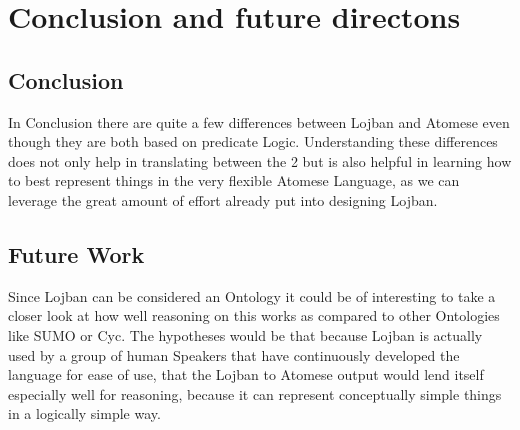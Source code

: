 
\chapter{Conclusion and future directons} %

\label{Chapter1} %


\newcommand{\keyword}[1]{\textbf{#1}}
\newcommand{\tabhead}[1]{\textbf{#1}}
\newcommand{\code}[1]{\texttt{#1}}
\newcommand{\file}[1]{\texttt{\bfseries#1}}
\newcommand{\option}[1]{\texttt{\itshape#1}}


\section{Conclusion}

In Conclusion there are quite a few differences between Lojban and Atomese even though they are both based on predicate Logic. Understanding these differences does not only help in translating between the 2 but is also helpful in learning how to best represent things in the very flexible Atomese Language, as we can leverage the great amount of effort already put into designing Lojban.

\section{Future Work}

Since Lojban can be considered an Ontology it could be of interesting to take a closer look at how well reasoning on this works as compared to other Ontologies like SUMO or Cyc. The hypotheses would be that because Lojban is actually used by a group of human Speakers that have continuously developed the language for ease of use, that the Lojban to Atomese output would lend itself especially well for reasoning, because it can represent conceptually simple things in a logically simple way. 
